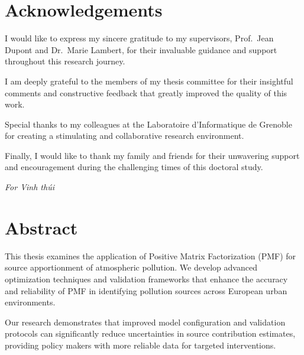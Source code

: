\documentclass[
  letterpaper,
  oneside,
  openany]{MastersDoctoralThesis}
\begin{document}

\chapter*{Acknowledgements}\label{acknowledgements}


I would like to express my sincere gratitude to my supervisors,
Prof.~Jean Dupont and Dr.~Marie Lambert, for their invaluable guidance
and support throughout this research journey.

I am deeply grateful to the members of my thesis committee for their
insightful comments and constructive feedback that greatly improved the
quality of this work.

Special thanks to my colleagues at the Laboratoire d'Informatique de
Grenoble for creating a stimulating and collaborative research
environment.

Finally, I would like to thank my family and friends for their
unwavering support and encouragement during the challenging times of
this doctoral study.

\clearpage
\begin{center}
\vspace*{\fill}
\textit{For Vinh thúi}
\vspace*{\fill}
\end{center}


\chapter*{Abstract}\label{abstract}


This thesis examines the application of Positive Matrix Factorization
(PMF) for source apportionment of atmospheric pollution. We develop
advanced optimization techniques and validation frameworks that enhance
the accuracy and reliability of PMF in identifying pollution sources
across European urban environments.

Our research demonstrates that improved model configuration and
validation protocols can significantly reduce uncertainties in source
contribution estimates, providing policy makers with more reliable data
for targeted interventions.
\end{document}
